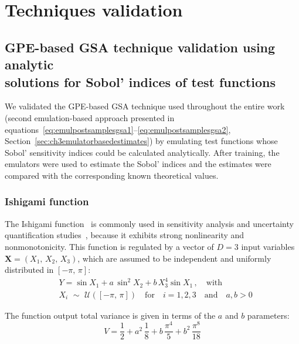 \chapter{Techniques validation}\label{cha:chapterA}

%
%
%
\section[GPE-based GSA technique validation using analytic solutions for Sobol' indices of test functions]{GPE-based GSA technique validation using analytic\\ solutions for Sobol' indices of test functions}\label{sec:chAGPE-based_GSA_technique_validation_using_analytic_solutions_for_Sobol'_indices_of_test_functions}
We validated the GPE-based GSA technique used throughout the entire work (second emulation-based approach presented in equations~\eqref{eq:emulpostsamplesgsa1}--\eqref{eq:emulpostsamplesgsa2}, Section~\ref{sec:ch3emulatorbasedestimates}) by emulating test functions whose Sobol' sensitivity indices could be calculated analytically. After training, the emulators were used to estimate the Sobol' indices and the estimates were compared with the corresponding known theoretical values.

%
%
%
\subsection{Ishigami function}
The Ishigami function~\cite{Ishigami:1990} is commonly used in sensitivity analysis and uncertainty quantification studies~\cite{Saltelli:2007}, because it exhibits strong nonlinearity and nonmonotonicity. This function is regulated by a vector of $D=3$ input variables $\mathbf{X}=(X_1,\,X_2,\,X_3)$, which are assumed to be independent and uniformly distributed in $[-\pi,\,\pi]$:
%
\begin{align}\label{eq:ishigamifun}
	& Y = \sin{X_1} + a\,\sin^2{X_2} + b\,X_3^4\sin{X_1}\,,\quad\text{with} \\
	& X_i\,\,\sim\,\,\mathcal{U}([-\pi,\,\pi])\quad \text{for}\quad i=1,2,3\quad \text{and}\quad a,b>0
\end{align}

\vspace{0.2cm}\noindent
The function output total variance is given in terms of the $a$ and $b$ parameters:
%
\begin{equation}\label{eq:ifun_total_var}
	V = \frac{1}{2} + a^2\,\frac{1}{8} + b\,\frac{\pi^4}{5} + b^2\,\frac{\pi^8}{18}
\end{equation}

